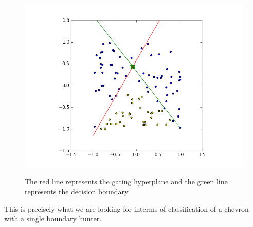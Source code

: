 \documentclass{article}
\theoremstyle{definition}
\begin{document}
\begin{figure}[H]
  \centering
  \begin{minipage}[b]{0.4\textwidth}
    \includegraphics[width=\textwidth]{GN-MH-01.png}
    \caption{}
  \end{minipage}
  \hfill

The red line represents the gating hyperplane and the green line represents the decision boundary
\end{figure}

This is precisely what we are looking for interms of classification of a chevron with a single boundary hunter.
\end{document}
